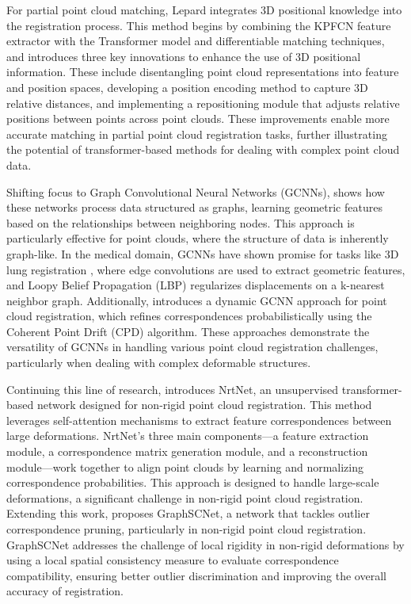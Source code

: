 For partial point cloud matching, Lepard \cite{li2022lepard} integrates 3D positional knowledge into the registration process. This method begins by combining the KPFCN feature extractor with the Transformer model and differentiable matching techniques, and introduces three key innovations to enhance the use of 3D positional information. These include disentangling point cloud representations into feature and position spaces, developing a position encoding method to capture 3D relative distances, and implementing a repositioning module that adjusts relative positions between points across point clouds. These improvements enable more accurate matching in partial point cloud registration tasks, further illustrating the potential of transformer-based methods for dealing with complex point cloud data.

Shifting focus to Graph Convolutional Neural Networks (GCNNs), \cite{zhang2019graph} shows how these networks process data structured as graphs, learning geometric features based on the relationships between neighboring nodes. This approach is particularly effective for point clouds, where the structure of data is inherently graph-like. In the medical domain, GCNNs have shown promise for tasks like 3D lung registration \cite{hansen2021deep}, where edge convolutions are used to extract geometric features, and Loopy Belief Propagation (LBP) regularizes displacements on a k-nearest neighbor graph. Additionally, \cite{hansen2019learning} introduces a dynamic GCNN approach for point cloud registration, which refines correspondences probabilistically using the Coherent Point Drift (CPD) algorithm. These approaches demonstrate the versatility of GCNNs in handling various point cloud registration challenges, particularly when dealing with complex deformable structures.

Continuing this line of research, \cite{hu2022nrtnet} introduces NrtNet, an unsupervised transformer-based network designed for non-rigid point cloud registration. This method leverages self-attention mechanisms to extract feature correspondences between large deformations. NrtNet's three main components—a feature extraction module, a correspondence matrix generation module, and a reconstruction module—work together to align point clouds by learning and normalizing correspondence probabilities. This approach is designed to handle large-scale deformations, a significant challenge in non-rigid point cloud registration. Extending this work, \cite{qin2023deep} proposes GraphSCNet, a network that tackles outlier correspondence pruning, particularly in non-rigid point cloud registration. GraphSCNet addresses the challenge of local rigidity in non-rigid deformations by using a local spatial consistency measure to evaluate correspondence compatibility, ensuring better outlier discrimination and improving the overall accuracy of registration.

